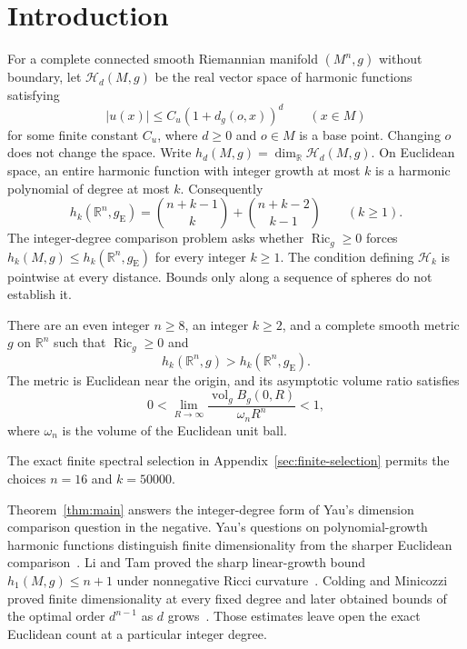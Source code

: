 \section{Introduction}\label{sec:introduction}

For a complete connected smooth Riemannian manifold $(M^n,g)$ without
boundary, let $\mathcal H_d(M,g)$ be the real vector space of harmonic
functions satisfying
\[
 |u(x)|\leq C_u(1+d_g(o,x))^d\qquad(x\in M)
\]
for some finite constant $C_u$, where $d\geq0$ and $o\in M$ is a base
point. Changing $o$ does not change the space. Write
$h_d(M,g)=\dim_{\mathbb R}\mathcal H_d(M,g)$. On Euclidean space, an
entire harmonic function with integer growth at most $k$ is a harmonic
polynomial of degree at most $k$. Consequently
\begin{equation}\label{eq:euclidean-comparator}
 h_k(\mathbb R^n,g_{\mathrm E})
 =\binom{n+k-1}{k}+\binom{n+k-2}{k-1}\qquad(k\geq1).
\end{equation}
The integer-degree comparison problem asks whether $\operatorname{Ric}_g
\geq0$ forces $h_k(M,g)\leq h_k(\mathbb R^n,g_{\mathrm E})$ for every
integer $k\geq1$. The condition defining $\mathcal H_k$ is pointwise at
every distance. Bounds only along a sequence of spheres do not establish it.

\begin{theorem}\label{thm:main}
There are an even integer $n\geq8$, an integer $k\geq2$, and a complete
smooth metric $g$ on $\mathbb R^n$ such that $\operatorname{Ric}_g\geq0$
and
\[
 h_k(\mathbb R^n,g)>h_k(\mathbb R^n,g_{\mathrm E}).
\]
The metric is Euclidean near the origin, and its asymptotic volume ratio
satisfies
\[
 0<\lim_{R\to\infty}
 \frac{\operatorname{vol}_g B_g(0,R)}{\omega_nR^n}<1,
\]
where $\omega_n$ is the volume of the Euclidean unit ball.
\end{theorem}

The exact finite spectral selection in Appendix~\ref{sec:finite-selection}
permits the choices \(n=16\) and \(k=50000\).

Theorem~\ref{thm:main} answers the integer-degree form of Yau's dimension
comparison question in the negative. Yau's questions on polynomial-growth harmonic functions distinguish finite
dimensionality from the sharper Euclidean comparison~\cite{Yau,LiTam}.
Li and Tam proved the sharp linear-growth bound $h_1(M,g)\leq n+1$ under
nonnegative Ricci curvature~\cite{LiTam}. Colding and Minicozzi proved
finite dimensionality at every fixed degree and later obtained bounds of
the optimal order $d^{n-1}$ as $d$ grows~\cite{CM97,CM98}. Those estimates
leave open the exact Euclidean count at a particular integer degree.

